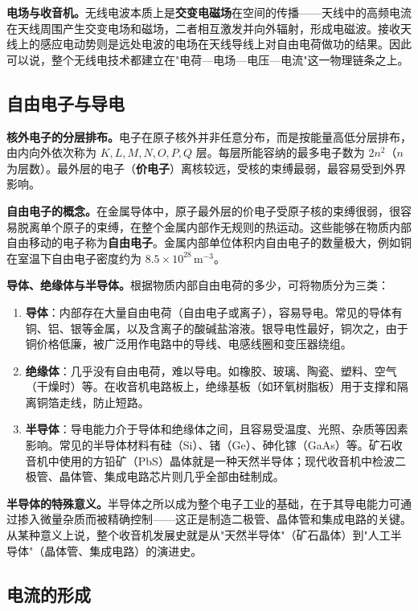 \documentclass[12pt,UTF8]{ctexbook}
\begin{document}
\textbf{电场与收音机。}无线电波本质上是\textbf{交变电磁场}在空间的传播——天线中的高频电流在天线周围产生交变电场和磁场，二者相互激发并向外辐射，形成电磁波。接收天线上的感应电动势则是远处电波的电场在天线导线上对自由电荷做功的结果。因此可以说，整个无线电技术都建立在"电荷—电场—电压—电流"这一物理链条之上。

\subsection{自由电子与导电}

\textbf{核外电子的分层排布。}电子在原子核外并非任意分布，而是按能量高低分层排布，由内向外依次称为 $K, L, M, N, O, P, Q$ 层。每层所能容纳的最多电子数为 $2n^2$（$n$ 为层数）。最外层的电子（\textbf{价电子}）离核较远，受核的束缚最弱，最容易受到外界影响。

\textbf{自由电子的概念。}在金属导体中，原子最外层的价电子受原子核的束缚很弱，很容易脱离单个原子的束缚，在整个金属内部作无规则的热运动。这些能够在物质内部自由移动的电子称为\textbf{自由电子}。金属内部单位体积内自由电子的数量极大，例如铜在室温下自由电子密度约为 $8.5 \times 10^{28}\,\mathrm{m^{-3}}$。

\textbf{导体、绝缘体与半导体。}根据物质内部自由电荷的多少，可将物质分为三类：

\begin{enumerate}
\item \textbf{导体}：内部存在大量自由电荷（自由电子或离子），容易导电。常见的导体有铜、铝、银等金属，以及含离子的酸碱盐溶液。银导电性最好，铜次之，由于铜价格低廉，被广泛用作电路中的导线、电感线圈和变压器绕组。
\item \textbf{绝缘体}：几乎没有自由电荷，难以导电。如橡胶、玻璃、陶瓷、塑料、空气（干燥时）等。在收音机电路板上，绝缘基板（如环氧树脂板）用于支撑和隔离铜箔走线，防止短路。
\item \textbf{半导体}：导电能力介于导体和绝缘体之间，且容易受温度、光照、杂质等因素影响。常见的半导体材料有硅（Si）、锗（Ge）、砷化镓（GaAs）等。矿石收音机中使用的方铅矿（PbS）晶体就是一种天然半导体；现代收音机中检波二极管、晶体管、集成电路芯片则几乎全部由硅制成。
\end{enumerate}

\textbf{半导体的特殊意义。}半导体之所以成为整个电子工业的基础，在于其导电能力可通过掺入微量杂质而被精确控制——这正是制造二极管、晶体管和集成电路的关键。从某种意义上说，整个收音机发展史就是从"天然半导体"（矿石晶体）到"人工半导体"（晶体管、集成电路）的演进史。

\subsection{电流的形成}
\end{document}
